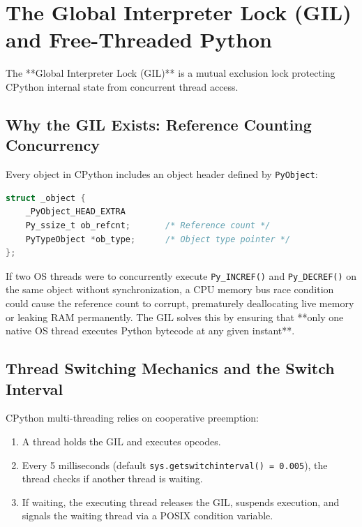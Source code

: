 \section{The Global Interpreter Lock (GIL) and Free-Threaded Python}

The **Global Interpreter Lock (GIL)** is a mutual exclusion lock protecting CPython internal state from concurrent thread access.

\subsection{Why the GIL Exists: Reference Counting Concurrency}

Every object in CPython includes an object header defined by \texttt{PyObject}:
\begin{lstlisting}[language=C]
struct _object {
    _PyObject_HEAD_EXTRA
    Py_ssize_t ob_refcnt;       /* Reference count */
    PyTypeObject *ob_type;      /* Object type pointer */
};
\end{lstlisting}

If two OS threads were to concurrently execute \texttt{Py\_INCREF()} and \texttt{Py\_DECREF()} on the same object without synchronization, a CPU memory bus race condition could cause the reference count to corrupt, prematurely deallocating live memory or leaking RAM permanently. The GIL solves this by ensuring that **only one native OS thread executes Python bytecode at any given instant**.

\subsection{Thread Switching Mechanics and the Switch Interval}

CPython multi-threading relies on cooperative preemption:
\begin{enumerate}[leftmargin=15pt]
  \item A thread holds the GIL and executes opcodes.
  \item Every 5 milliseconds (default \texttt{sys.getswitchinterval() = 0.005}), the thread checks if another thread is waiting.
  \item If waiting, the executing thread releases the GIL, suspends execution, and signals the waiting thread via a POSIX condition variable.
\end{enumerate}

